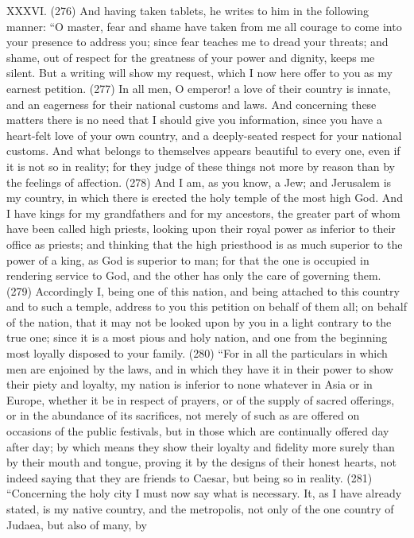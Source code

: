 XXXVI. (276) And having taken tablets, he writes to him in the following manner: ``O master, fear
and shame have taken from me all courage to come into your presence to address you; since fear
teaches me to dread your threats; and shame, out of respect for the greatness of your power and
dignity, keeps me silent. But a writing will show my request, which I now here offer to you as my
earnest petition. (277) In all men, O emperor! a love of their country is innate, and an eagerness
for their national customs and laws. And concerning these matters there is no need that I should
give you information, since you have a heart-felt love of your own country, and a deeply-seated
respect for your national customs. And what belongs to themselves appears beautiful to every one,
even if it is not so in reality; for they judge of these things not more by reason than by the feelings
of affection. (278) And I am, as you know, a Jew; and Jerusalem is my country, in which there is
erected the holy temple of the most high God. And I have kings for my grandfathers and for my
ancestors, the greater part of whom have been called high priests, looking upon their royal power
as inferior to their office as priests; and thinking that the high priesthood is as much superior to the
power of a king, as God is superior to man; for that the one is occupied in rendering service to
God, and the other has only the care of governing them. (279) Accordingly I, being one of this
nation, and being attached to this country and to such a temple, address to you this petition on
behalf of them all; on behalf of the nation, that it may not be looked upon by you in a light contrary to
the true one; since it is a most pious and holy nation, and one from the beginning most loyally
disposed to your family. (280) ``For in all the particulars in which men are enjoined by the laws, and
in which they have it in their power to show their piety and loyalty, my nation is inferior to none
whatever in Asia or in Europe, whether it be in respect of prayers, or of the supply of sacred
offerings, or in the abundance of its sacrifices, not merely of such as are offered on occasions of
the public festivals, but in those which are continually offered day after day; by which means they
show their loyalty and fidelity more surely than by their mouth and tongue, proving it by the designs
of their honest hearts, not indeed saying that they are friends to Caesar, but being so in reality.
(281) ``Concerning the holy city I must now say what is necessary. It, as I have already stated, is
my native country, and the metropolis, not only of the one country of Judaea, but also of many, by
